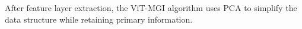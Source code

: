 \documentclass[conference]{IEEEtran}
\begin{document}


After feature layer extraction, the ViT-MGI algorithm uses PCA to simplify the data structure while retaining primary information.












\end{document}
